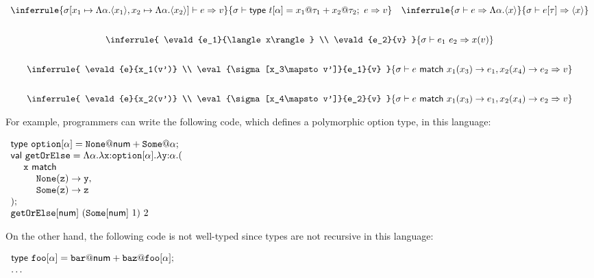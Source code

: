 \begin{enumerate}
$
  \begin{array}{c}
  \inferrule
  { \eval{\sigma[x_1\mapsto\Lambda\alpha.\langle x_1\rangle,x_2\mapsto\Lambda\alpha.\langle x_2\rangle]}{e}{v} }
  { \evald{\textsf{type}\ t[\alpha]=x_1@\tau_1+x_2@\tau_2;\ e}{v} }
  \quad
  \inferrule
  { \evald{e}{\Lambda \alpha.\langle x\rangle} }
  { \evald{\etapp{e}{\tau}}{\langle x\rangle} }
  \\[2em]
  \inferrule
  { \evald{e_1}{\langle x\rangle} \\ \evald{e_2}{v} }
  { \evald{\eapp{e_1}{e_2}}{x(v)} }
  \\[2em]
  \inferrule
  { \evald{e}{x_1(v')} \\ \eval{\sigma[x_3\mapsto v']}{e_1}{v} }
  { \evald{e\ \textsf{match}\ x_1(x_3)\rightarrow e_1,x_2(x_4)\rightarrow e_2}{v} }
  \\[2em]
  \inferrule
  { \evald{e}{x_2(v')} \\ \eval{\sigma[x_4\mapsto v']}{e_2}{v} }
  { \evald{e\ \textsf{match}\ x_1(x_3)\rightarrow e_1,x_2(x_4)\rightarrow e_2}{v} }
  \end{array}
$
\vspace{0.5em}

For example, programmers can write the following code, which defines a polymorphic
option type, in this language:

\vspace{0.5em}
$
  \begin{array}{l}
    \textsf{type}\ \code{option}[\alpha]=\code{None}@\tnum+\code{Some}@\alpha;\\
    \textsf{val}\ \code{getOrElse}=\etfun{\alpha}{\efun{\code{x}{:}\code{option}[\alpha]}{
      \efun{\code{y}{:}\alpha}{(}} \\
    \ \ \ \ \code{x}\ \textsf{match}} \\
    \ \ \ \ \ \ \ \ \code{None}(\code{z})\rightarrow\code{y}, \\
    \ \ \ \ \ \ \ \ \code{Some}(\code{z})\rightarrow\code{z} \\
    );\\
    \eapp{\eapp{\etapp{\code{getOrElse}}{\tnum}}{(\eapp{\etapp{\code{Some}}{\tnum}}{1})}}{2}
  \end{array}
$
\vspace{0.5em}

On the other hand, the following code is not well-typed
since types are not recursive in this language:

\vspace{0.5em}
$
  \begin{array}{l}
    \textsf{type}\ \code{foo}[\alpha]=\code{bar}@\tnum+\code{baz}@\code{foo}[\alpha];\\
    \ldots
  \end{array}
$
\vspace{0.5em}


\end{enumerate}
